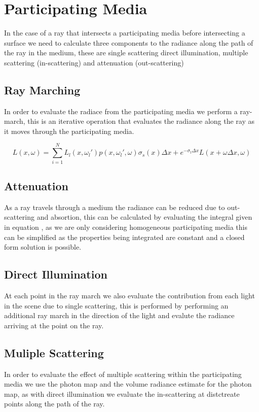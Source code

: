 \section{Participating Media}

In the case of a ray that intersects a participating media before intersecting a surface we need to calculate three components to
the radiance along the path of the ray in the medium, these are single scattering direct illumination, multiple scattering (in-scattering)
and attenuation (out-scattering)

\subsection{Ray Marching}
In order to evaluate the radiace from the participating media we perform a ray-march, this is an iterative operation that evaluates the
radiance along the ray as it moves through the participating media.

\begin{equation}
L(x, \omega) = \sum\limits_{i = 1}^N L_l(x, \omega_l')p(x, \omega_l', \omega)\sigma_s(x)\Delta x + e^{- \sigma_t \Delta x} L (x + \omega \Delta x, \omega)
\end{equation}

\subsection{Attenuation}
As a ray travels through a medium the radiance can be reduced due to out-scattering and absortion, this can be calculated by evaluating
the integral given in equation , as we are only considering homogeneous participating media this can be
simplified as the properties being integrated are constant and a closed form solution is possible.


\subsection{Direct Illumination}
At each point in the ray march we also evaluate the contribution from each light in the scene due to single scattering, this is performed
by performing an additional ray march in the direction of the light and evalute the radiance arriving at the point on the ray.

\subsection{Muliple Scattering}
In order to evaluate the effect of multiple scattering within the participating media we use the photon map and the volume radiance estimate
for the photon map, as with direct illumination we evaluate the in-scattering at distctreate points along the path of the ray.
